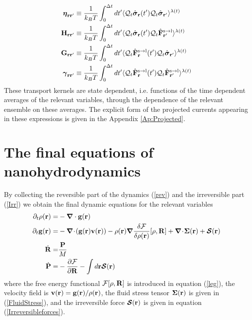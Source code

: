 \documentclass[b5paper,openright,10pt]{book}
\newcommand{\esc}{\!\cdot\!}
\begin{document}
\begin{align}
  \boldsymbol{\eta}_{{\bf  r}{\bf r}'} &\equiv
\frac{1}{k_BT}\int_0^{\Delta t} dt'\langle 
{\cal Q}_t\hat{\boldsymbol{\sigma}}_{{\bf r}}(t')
{\cal Q}_t\hat{\boldsymbol{\sigma}}_{{\bf r}'}\rangle^{\lambda(t)}
\nonumber\\
{\bf H}_{{\bf r}{\bf r}'}&\equiv\frac{1}{k_BT}\int_0^{\Delta t} dt'
\langle {\cal Q}_t\hat{\boldsymbol{\sigma}}_{{\bf r}}(t')
{\cal Q}_t\hat{\bf F}^{\rm s\to l}_{{\bf r}'}\rangle^{\lambda(t)}
\nonumber\\
{\bf G}_{{\bf r}{\bf r}'}&\equiv\frac{1}{k_BT}\int_0^{\Delta t} dt'
\langle {\cal Q}_t\hat{\bf F}^{\rm s\to l}_{{\bf r}}(t')
{\cal Q}_t\hat{\boldsymbol{\sigma}}_{{\bf r}'}\rangle^{\lambda(t)}
\nonumber\\
\boldsymbol{\gamma}_{{\bf  r}{\bf r}'}&\equiv\frac{1}{k_BT}\int_0^{\Delta t} dt'
\langle 
{\cal Q}_t\hat{\bf F}^{\rm s\to l}_{{\bf r}}(t')
{\cal Q}_t\hat{\bf F}^{\rm s\to l}_{{\bf r}'}\rangle^{\lambda(t)}
\label{GK1}
\end{align}
These transport  kernels are state  dependent, i.e.  functions  of the
time  dependent  averages  of  the  relevant  variables,  through  the
dependence of  the relevant ensemble  on these averages.  The explicit
form of the projected currents appearing in these expressions is given
in the Appendix \ref{Ap:Projected}.

\section{The final equations of nanohydrodynamics} 
By collecting the reversible part  of the dynamics (\ref{rev}) and the
irreversible part  (\ref{Irr}) we  obtain the final  dynamic equations
for the relevant variables
\begin{align}
\partial_t\rho({\bf r})=&-\boldsymbol{\nabla}\cdot{\bf g}({\bf r})
\nonumber\\
\partial_t{\bf g}({\bf r})=&-\boldsymbol{\nabla}\esc{\left({\bf g}({\bf r}){\bf v}({\bf r})\right)}
-\rho({\bf r})\boldsymbol{\nabla}\frac{\delta {\cal F}}{\delta\rho({\bf r})}[\rho,{\bf R}]
+\boldsymbol{\nabla}\esc\boldsymbol{\Sigma}({\bf r})+\boldsymbol{{\cal S}}({\bf r})
\nonumber\\
\dot{\bf R}=&\frac{\bf P}{M}
\nonumber\\
\dot{\bf P}=&-\frac{\partial {\cal F}}{\partial {\bf R}}
-\int d {{\bf r}}\boldsymbol{{\cal S}}({\bf r})
\label{finaleq}
\end{align}
where  the   free  energy  functional  ${\cal   F}[\rho,{\bf  R}]$  is
introduced  in  equation (\ref{leg}),  the  velocity  field is  ${\bf  v}({\bf
  r})={\bf  g}({\bf  r})/\rho({\bf  r})$,   the  fluid  stress  tensor
$\boldsymbol{\Sigma}({\bf  r})$ is  given in  (\ref{FluidStress}), and
the irreversible  force $\boldsymbol{{\cal  S}}({\bf r})$ is  given in
equation (\ref{Irreversibleforces}).
\end{document}
